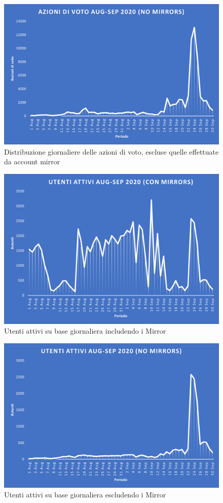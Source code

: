     
\begin{figure}[t]
    \centering
    \includegraphics[width=.7\textwidth]{graphs/daily_azionivoto_nomirr.png}
    \caption{Distribuzione giornaliere delle azioni di voto, escluse quelle effettuate da account mirror}
    \label{fig: voting_daily_nomirr}
    
\end{figure}    
\begin{figure}[t]
    \centering
    \includegraphics[width=.7\textwidth]{graphs/daily_attivi.png}
    \caption{Utenti attivi su base giornaliera includendo i Mirror}
    \label{fig: attivi_daily_conmirr}
\end{figure}


\begin{figure}[t]
    \centering
    \includegraphics[width=.7\textwidth]{graphs/daily_attivi_nomirr.png}
    \caption{Utenti attivi su base giornaliera escludendo i Mirror}
    \label{fig: attivi_daily_nomirr}
\end{figure}


